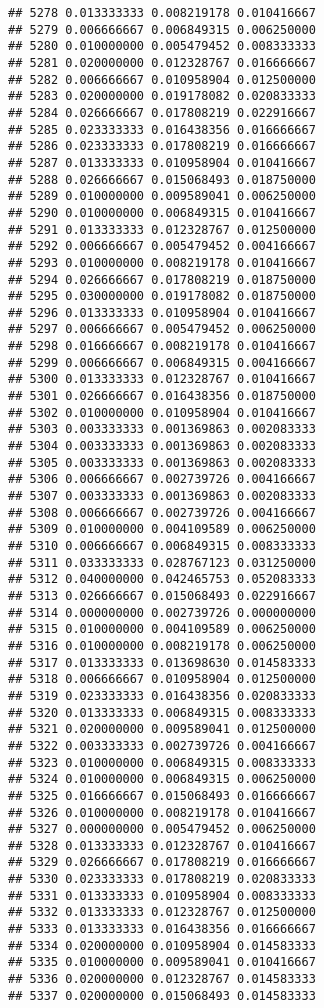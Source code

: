 \documentclass[
]{article}
\begin{document}
\begin{verbatim}
## 5278 0.013333333 0.008219178 0.010416667
## 5279 0.006666667 0.006849315 0.006250000
## 5280 0.010000000 0.005479452 0.008333333
## 5281 0.020000000 0.012328767 0.016666667
## 5282 0.006666667 0.010958904 0.012500000
## 5283 0.020000000 0.019178082 0.020833333
## 5284 0.026666667 0.017808219 0.022916667
## 5285 0.023333333 0.016438356 0.016666667
## 5286 0.023333333 0.017808219 0.016666667
## 5287 0.013333333 0.010958904 0.010416667
## 5288 0.026666667 0.015068493 0.018750000
## 5289 0.010000000 0.009589041 0.006250000
## 5290 0.010000000 0.006849315 0.010416667
## 5291 0.013333333 0.012328767 0.012500000
## 5292 0.006666667 0.005479452 0.004166667
## 5293 0.010000000 0.008219178 0.010416667
## 5294 0.026666667 0.017808219 0.018750000
## 5295 0.030000000 0.019178082 0.018750000
## 5296 0.013333333 0.010958904 0.010416667
## 5297 0.006666667 0.005479452 0.006250000
## 5298 0.016666667 0.008219178 0.010416667
## 5299 0.006666667 0.006849315 0.004166667
## 5300 0.013333333 0.012328767 0.010416667
## 5301 0.026666667 0.016438356 0.018750000
## 5302 0.010000000 0.010958904 0.010416667
## 5303 0.003333333 0.001369863 0.002083333
## 5304 0.003333333 0.001369863 0.002083333
## 5305 0.003333333 0.001369863 0.002083333
## 5306 0.006666667 0.002739726 0.004166667
## 5307 0.003333333 0.001369863 0.002083333
## 5308 0.006666667 0.002739726 0.004166667
## 5309 0.010000000 0.004109589 0.006250000
## 5310 0.006666667 0.006849315 0.008333333
## 5311 0.033333333 0.028767123 0.031250000
## 5312 0.040000000 0.042465753 0.052083333
## 5313 0.026666667 0.015068493 0.022916667
## 5314 0.000000000 0.002739726 0.000000000
## 5315 0.010000000 0.004109589 0.006250000
## 5316 0.010000000 0.008219178 0.006250000
## 5317 0.013333333 0.013698630 0.014583333
## 5318 0.006666667 0.010958904 0.012500000
## 5319 0.023333333 0.016438356 0.020833333
## 5320 0.013333333 0.006849315 0.008333333
## 5321 0.020000000 0.009589041 0.012500000
## 5322 0.003333333 0.002739726 0.004166667
## 5323 0.010000000 0.006849315 0.008333333
## 5324 0.010000000 0.006849315 0.006250000
## 5325 0.016666667 0.015068493 0.016666667
## 5326 0.010000000 0.008219178 0.010416667
## 5327 0.000000000 0.005479452 0.006250000
## 5328 0.013333333 0.012328767 0.010416667
## 5329 0.026666667 0.017808219 0.016666667
## 5330 0.023333333 0.017808219 0.020833333
## 5331 0.013333333 0.010958904 0.008333333
## 5332 0.013333333 0.012328767 0.012500000
## 5333 0.013333333 0.016438356 0.016666667
## 5334 0.020000000 0.010958904 0.014583333
## 5335 0.010000000 0.009589041 0.010416667
## 5336 0.020000000 0.012328767 0.014583333
## 5337 0.020000000 0.015068493 0.014583333

\end{verbatim}
\end{document}
